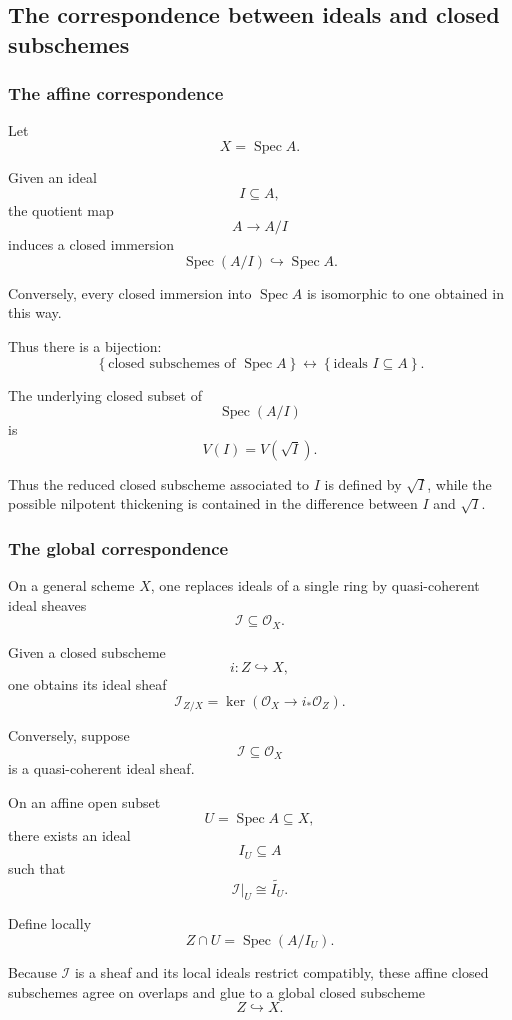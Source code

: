 \documentclass[12pt,a4paper]{article}
\DeclareMathOperator{\Spec}{Spec}
\newcommand{\OO}{\mathcal{O}}
\providecommand{\Spec}{\operatorname{Spec}}
\theoremstyle{notespace}
\begin{document}
\subsection{The correspondence between ideals and closed subschemes}

\subsubsection{The affine correspondence}

Let
\[
X=\Spec A.
\]

Given an ideal
\[
I\subseteq A,
\]
the quotient map
\[
A\longrightarrow A/I
\]
induces a closed immersion
\[
\Spec(A/I)\hookrightarrow\Spec A.
\]

Conversely, every closed immersion into \(\Spec A\) is isomorphic to one obtained in this way.

Thus there is a bijection:
\[
\boxed{
	\left\{
	\text{closed subschemes of }\Spec A
	\right\}
	\longleftrightarrow
	\left\{
	\text{ideals }I\subseteq A
	\right\}.
}
\]

The underlying closed subset of
\[
\Spec(A/I)
\]
is
\[
V(I)=V(\sqrt I).
\]

Thus the reduced closed subscheme associated to \(I\) is defined by \(\sqrt I\), while the possible nilpotent thickening is contained in the difference between \(I\) and \(\sqrt I\).

\subsubsection{The global correspondence}

On a general scheme \(X\), one replaces ideals of a single ring by quasi-coherent ideal sheaves
\[
\mathcal{I}\subseteq\OO_X.
\]

Given a closed subscheme
\[
i:Z\hookrightarrow X,
\]
one obtains its ideal sheaf
\[
\mathcal{I}_{Z/X}
=
\ker(\OO_X\to i_*\OO_Z).
\]

Conversely, suppose
\[
\mathcal{I}\subseteq\OO_X
\]
is a quasi-coherent ideal sheaf.

On an affine open subset
\[
U=\Spec A\subseteq X,
\]
there exists an ideal
\[
I_U\subseteq A
\]
such that
\[
\mathcal{I}|_U\cong\widetilde{I_U}.
\]

Define locally
\[
Z\cap U=\Spec(A/I_U).
\]

Because \(\mathcal{I}\) is a sheaf and its local ideals restrict compatibly, these affine closed subschemes agree on overlaps and glue to a global closed subscheme
\[
Z\hookrightarrow X.
\]
\end{document}
